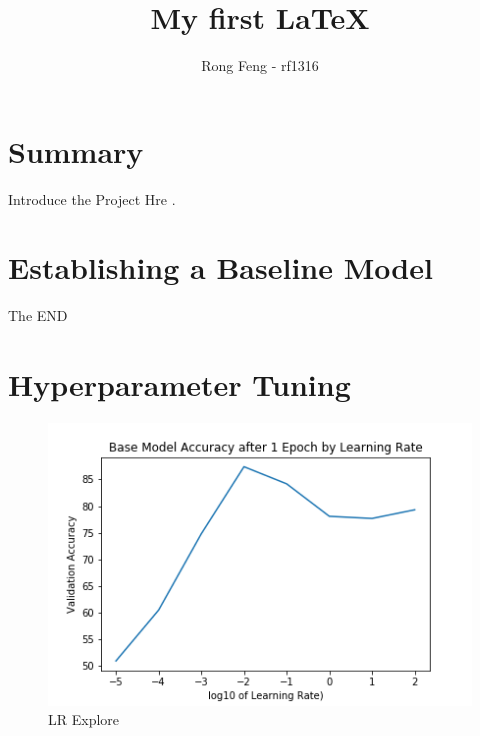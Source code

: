 \documentclass[a4paper,10pt]{article}
\title{My first LaTeX}
\author{Rong Feng - rf1316}
\begin{document}
\maketitle

\section{Summary}
Introduce the Project Hre \cite{latexcompanion,knuthwebsite}. 


\section{Establishing a Baseline Model}
The END


\section{Hyperparameter Tuning}

\begin{figure}[!h]
  \centering
    \includegraphics[scale=0.5]{lr_explore}
  \caption{LR Explore} \label{fig:lr}
\end{figure}

\medskip


\end{document}
